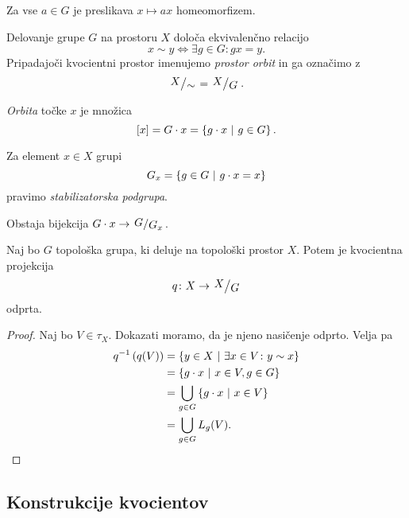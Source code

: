 \begin{opomba}
Za vse $a \in G$ je preslikava $x \mapsto ax$ homeomorfizem.
\end{opomba}

\begin{trditev}
Delovanje grupe $G$ na prostoru $X$ določa ekvivalenčno relacijo
\[
x \sim y \iff \exists g \in G \colon gx = y.
\]
Pripadajoči kvocientni prostor imenujemo
\emph{prostor orbit} in ga
označimo z
\[
\kvoc{X}{\sim} = \kvoc{X}{G}.
\]
\end{trditev}

\obvs

\begin{definicija}
\emph{Orbita} točke $x$ je množica
\[
[x] = G \cdot x = \left\{g \cdot x~\middle\vert~g \in G\right\}.
\]
\end{definicija}

\begin{definicija}
Za element $x \in X$ grupi
\[
G_x = \left\{g \in G~\middle\vert~g \cdot x = x\right\}
\]
pravimo
\emph{stabilizatorska podgrupa}.
\end{definicija}

\begin{opomba}
Obstaja bijekcija $G \cdot x \to \kvoc{G}{G_x}$.
\end{opomba}

\begin{trditev}\label{td:grodp}
Naj bo $G$ topološka grupa, ki deluje na topološki prostor $X$.
Potem je kvocientna projekcija
\[
q \colon X \to \kvoc{X}{G}
\]
odprta.
\end{trditev}

\begin{proof}
Naj bo $V \in \tau_X$. Dokazati moramo, da je njeno nasičenje
odprto. Velja pa
\begin{align*}
q^{-1}\left(q(V)\right)
&=
\left\{y \in X~\middle\vert~\exists x \in V \colon y \sim x\right\}
\\
&=
\left\{g \cdot x~\middle\vert~x \in V, g \in G\right\}
\\
&=
\bigcup_{g \in G} \left\{g \cdot x~\middle\vert~x \in V\right\}
\\
&= \bigcup_{g \in G} L_g(V). \qedhere
\end{align*}
\end{proof}

\newpage

\subsection{Konstrukcije kvocientov}

